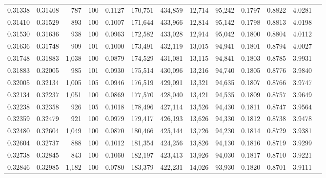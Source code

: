 \begin{tabular}{rrrrrrrrrrrrr}
0.31338 & 0.31408 &   787 & 100 &                                     0.1127 & 170,751 & 434,859 &  12,714 &  95,242 & 0.1797 & 0.8822 & 4.0281 \\
0.31410 & 0.31529 &   893 & 100 &                                     0.1007 & 171,644 & 433,966 &  12,814 &  95,142 & 0.1798 & 0.8813 & 4.0198 \\
0.31530 & 0.31636 &   938 & 100 &                                     0.0963 & 172,582 & 433,028 &  12,914 &  95,042 & 0.1800 & 0.8804 & 4.0112 \\
0.31636 & 0.31748 &   909 & 101 &                                     0.1000 & 173,491 & 432,119 &  13,015 &  94,941 & 0.1801 & 0.8794 & 4.0027 \\
0.31748 & 0.31883 & 1,038 & 100 &                                     0.0879 & 174,529 & 431,081 &  13,115 &  94,841 & 0.1803 & 0.8785 & 3.9931 \\
0.31883 & 0.32005 &   985 & 101 &                                     0.0930 & 175,514 & 430,096 &  13,216 &  94,740 & 0.1805 & 0.8776 & 3.9840 \\
0.32005 & 0.32134 & 1,005 & 105 &                                     0.0946 & 176,519 & 429,091 &  13,321 &  94,635 & 0.1807 & 0.8766 & 3.9747 \\
0.32134 & 0.32237 & 1,051 & 100 &                                     0.0869 & 177,570 & 428,040 &  13,421 &  94,535 & 0.1809 & 0.8757 & 3.9649 \\
0.32238 & 0.32358 &   926 & 105 &                                     0.1018 & 178,496 & 427,114 &  13,526 &  94,430 & 0.1811 & 0.8747 & 3.9564 \\
0.32359 & 0.32479 &   921 & 100 &                                     0.0979 & 179,417 & 426,193 &  13,626 &  94,330 & 0.1812 & 0.8738 & 3.9478 \\
0.32480 & 0.32604 & 1,049 & 100 &                                     0.0870 & 180,466 & 425,144 &  13,726 &  94,230 & 0.1814 & 0.8729 & 3.9381 \\
0.32604 & 0.32737 &   888 & 100 &                                     0.1012 & 181,354 & 424,256 &  13,826 &  94,130 & 0.1816 & 0.8719 & 3.9299 \\
0.32738 & 0.32845 &   843 & 100 &                                     0.1060 & 182,197 & 423,413 &  13,926 &  94,030 & 0.1817 & 0.8710 & 3.9221 \\
0.32846 & 0.32985 & 1,182 & 100 &                                     0.0780 & 183,379 & 422,231 &  14,026 &  93,930 & 0.1820 & 0.8701 & 3.9111 \\

\end{tabular}
